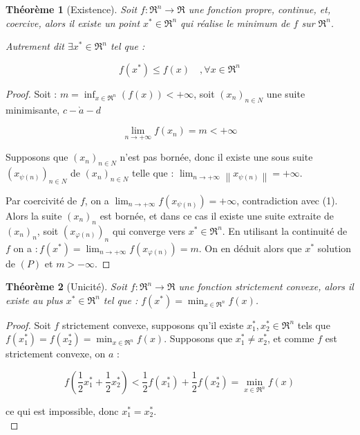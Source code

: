 \documentclass[a4paper,12pt,openany]{book}
\theoremstyle{plain}
\newtheorem{theorem}{Théorème}[section]
\theoremstyle{definition}
\theoremstyle{remark}
\theoremstyle{nbstyle}
\begin{document}
	\begin{theorem}[Existence] Soit $f: \Re^{n} \longrightarrow \Re$ une fonction propre, continue, et, coercive, alors il existe un point $x^{*} \in \Re^{n}$ qui réalise le minimum de $f$ sur $\Re^{n}$.
		
		Autrement dit $\exists x^{*} \in \Re^{n}$ tel que :
		
		$$
		f\left(x^{*}\right) \leq f(x) \quad, \forall x \in \Re^{n}
		$$
	\end{theorem}
	\begin{proof}
		Soit : $m=\inf _{x \in \Re^{n}}(f(x))<+\infty$, soit $\left(x_{n}\right)_{n \in N}$ une suite minimisante, $c-\grave{a}-d$
		
		
		\begin{equation*}
		\lim _{n \longrightarrow+\infty} f\left(x_{n}\right)=m<+\infty \tag{1}
		\end{equation*}
		
		
		Supposons que $\left(x_{n}\right)_{n \in N}$ n'est pas bornée, donc il existe une sous suite $\left(x_{\psi(n)}\right)_{n \in N}$ de $\left(x_{n}\right)_{n \in N}$ telle que : $\lim _{n \longrightarrow+\infty}\left\|x_{\psi(n)}\right\|=+\infty$.
		
		Par coercivité de $f$, on a $\lim _{n \longrightarrow+\infty} f\left(x_{\psi(n)}\right)=+\infty$, contradiction avec (1). Alors la suite $\left(x_{n}\right)_{n}$ est bornée, et dans ce cas il existe une suite extraite de $\left(x_{n}\right)_{n}$, soit $\left(x_{\varphi(n)}\right)_{n}$ qui converge vers $x^{*} \in \Re^{n}$. En utilisant la continuité de $f$ on a $: f\left(x^{*}\right)= \lim _{n \longrightarrow+\infty} f\left(x_{\varphi(n)}\right)=m$. On en déduit alors que $x^{*}$ solution de $(P)$ et $m>-\infty$.
	\end{proof}
	\begin{theorem}[Unicité] Soit $f: \Re^{n} \longrightarrow \Re$ une fonction strictement convexe, alors il existe au plus $x^{*} \in \Re^{n}$ tel que : $f\left(x^{*}\right)=\displaystyle\min _{x \in \Re^{n}} f(x)$.
	\end{theorem}
	\begin{proof}
		Soit $f$ strictement convexe, supposons qu'il existe $x_{1}^{*}, x_{2}^{*} \in \Re^{n}$ tels que $f\left(x_{1}^{*}\right)= f\left(x_{2}^{*}\right)=\displaystyle\min _{x \in \Re^{n}} f(x)$. Supposons que $x_{1}^{*} \neq x_{2}^{*}$, et comme $f$ est strictement convexe, on $a$ :
		
		$$
		f\left(\frac{1}{2} x_{1}^{*}+\frac{1}{2} x_{2}^{*}\right)<\frac{1}{2} f\left(x_{1}^{*}\right)+\frac{1}{2} f\left(x_{2}^{*}\right)=\displaystyle\min _{x \in \Re^{n}} f(x)
		$$
		
		ce qui est impossible, donc $x_{1}^{*}=x_{2}^{*}$.\\
	\end{proof}
\end{document}
